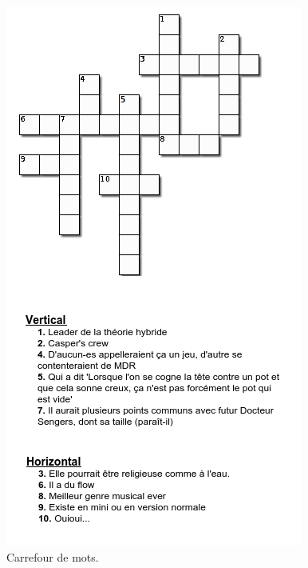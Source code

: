 \documentclass[a4paper]{leaflet}
\begin{document}
\begin{figure}
	\includegraphics[width=\textwidth]{mots.png}
	\caption{Carrefour de mots.}
        \label{fig:carrouf}
\end{figure}
\end{document}
